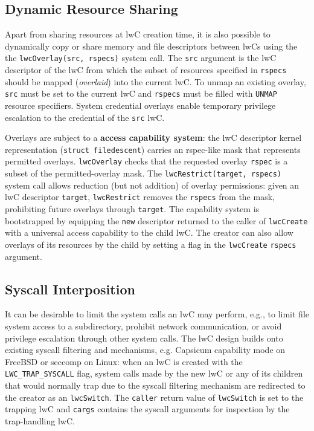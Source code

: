 \documentclass[10pt,twocolumn,a4paper]{article}
\begin{document}
\subsection{Dynamic Resource Sharing}\label{design:overlays}
Apart from sharing resources at lwC creation time, it is also possible to dynamically copy or share memory and file descriptors between lwCs using the the \lstinline{lwcOverlay(src, rspecs)} system call.
The \lstinline{src} argument is the lwC descriptor of the lwC from which the subset of resources specified in \lstinline{rspecs} should be mapped (\textit{overlaid}) into the current lwC.
To unmap an existing overlay, \lstinline{src} must be set to the current lwC and \lstinline{rspecs} must be filled with \lstinline{UNMAP} resource specifiers. 
System credential overlays enable temporary privilege escalation to the credential of the \lstinline{src} lwC.
\cite{lwcpaper}

Overlays are subject to a \textbf{access capability system}:
the lwC descriptor kernel representation (\lstinline{struct filedescent}) carries an rspec-like mask that represents permitted overlays.
\lstinline{lwcOverlay} checks that the requested overlay \lstinline{rspec} is a subset of the permitted-overlay mask.
The \lstinline{lwcRestrict(target, rspecs)} system call allows reduction (but not addition) of overlay permissions:
given an lwC descriptor \lstinline{target}, \lstinline{lwcRestrict} removes the \lstinline{rspecs} from the mask, prohibiting future overlays through \lstinline{target}.
The capability system is bootstrapped by equipping the \lstinline{new} descriptor returned to the caller of \lstinline{lwcCreate} with a universal access capability to the child lwC.
The creator can also allow overlays of its resources by the child by setting a flag %
in the \lstinline{lwcCreate} \lstinline{rspecs} argument. 
\cite{lwckernelrepo,lwcpaper}

\subsection{Syscall Interposition}\label{design:syscallinterpos}
It can be desirable to limit the system calls an lwC may perform, e.g., to limit file system access to a subdirectory, prohibit network communication, or avoid privilege escalation through other system calls.  
The lwC design builds onto existing syscall filtering and mechanisms, e.g. Capsicum capability mode on FreeBSD or seccomp on Linux:
when an lwC is created with the \lstinline{LWC_TRAP_SYSCALL} flag, system calls made by the new lwC or any of its children that would normally trap due to the syscall filtering mechanism are redirected to the creator as an \lstinline{lwcSwitch}.
The \lstinline{caller} return value of \lstinline{lwcSwitch} is set to the trapping lwC and \lstinline{cargs} contains the syscall arguments for inspection by the trap-handling lwC.
\cite{lwcpaper}
\end{document}

